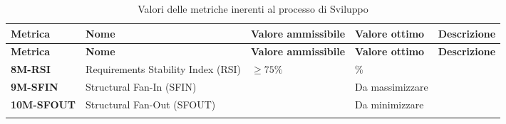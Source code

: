 \begin{longtable}{|>{\centering\arraybackslash}p{}|>{\centering\arraybackslash}p{}|>{\centering\arraybackslash}p{}|>{\centering\arraybackslash}p{}|>{\centering\arraybackslash}p{}|}
    \hline
    \textbf{Metrica} & \textbf{Nome} & \textbf{Valore ammissibile} & \textbf{Valore ottimo}& \textbf{Descrizione}\\
	\hline
    \endfirsthead
    \hline
    \textbf{Metrica} & \textbf{Nome} & \textbf{Valore ammissibile} & \textbf{Valore ottimo}& \textbf{Descrizione}\\
    \endhead
	\textbf{8M-RSI} 		& Requirements Stability Index (RSI) 	& $\geq 75\% $ 			& 100\% & \\
	\hline
	\textbf{9M-SFIN} 		& Structural Fan-In (SFIN) 				&  						& Da massimizzare & \\ 
	\hline
	\textbf{10M-SFOUT} 		& Structural Fan-Out (SFOUT) 			&  						& Da minimizzare & \\ 
	\hline
	\caption{ Valori delle metriche inerenti al processo di Sviluppo}
	\label{table:2}
\end{longtable}
